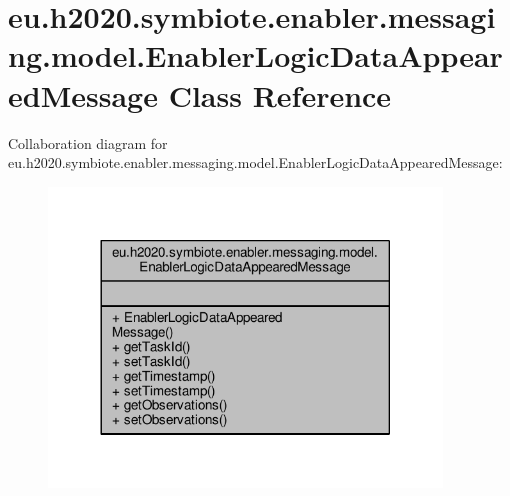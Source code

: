 \hypertarget{classeu_1_1h2020_1_1symbiote_1_1enabler_1_1messaging_1_1model_1_1EnablerLogicDataAppearedMessage}{}\section{eu.\+h2020.\+symbiote.\+enabler.\+messaging.\+model.\+Enabler\+Logic\+Data\+Appeared\+Message Class Reference}
\label{classeu_1_1h2020_1_1symbiote_1_1enabler_1_1messaging_1_1model_1_1EnablerLogicDataAppearedMessage}


Collaboration diagram for eu.\+h2020.\+symbiote.\+enabler.\+messaging.\+model.\+Enabler\+Logic\+Data\+Appeared\+Message\+:
\nopagebreak
\begin{figure}[H]
\begin{center}
\leavevmode
\includegraphics[width=296pt]{classeu_1_1h2020_1_1symbiote_1_1enabler_1_1messaging_1_1model_1_1EnablerLogicDataAppearedMessage__coll__graph}
\end{center}
\end{figure}
